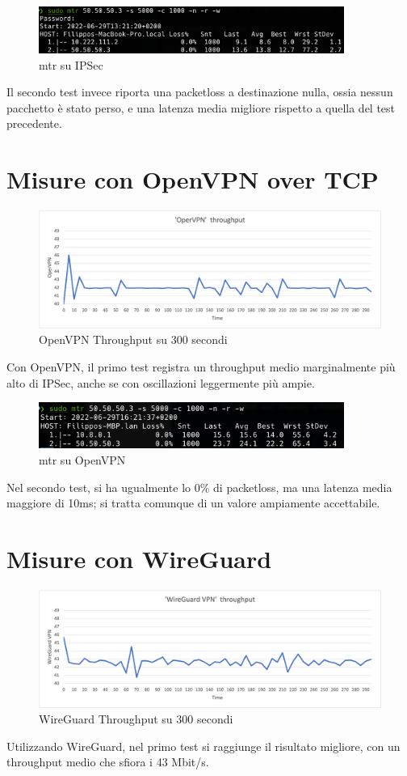 \begin{figure}[ht]
    \centering
    \includegraphics[width=10cm]{figure/mtr_16min_ipsec.png}
    \caption{mtr su IPSec}
\end{figure}
Il secondo test invece riporta una packetloss a destinazione nulla, ossia nessun pacchetto è stato perso, e una latenza media migliore rispetto a quella del test precedente.


\section{Misure con OpenVPN over TCP}
\begin{figure}[ht]
    \centering
    \includegraphics[width=12cm]{figure/vpn_thr.png-3.png}
    \caption{OpenVPN Throughput su 300 secondi}
\end{figure}
Con OpenVPN, il primo test registra un throughput medio marginalmente più alto di IPSec, anche se con oscillazioni leggermente più ampie.

\begin{figure}[ht]
    \centering
    \includegraphics[width=10cm]{figure/mtr_16min_ovpn.png}
    \caption{mtr su OpenVPN}
\end{figure}
Nel secondo test, si ha ugualmente lo 0\% di packetloss, ma una latenza media maggiore di 10ms; si tratta comunque di un valore ampiamente accettabile.


\section{Misure con WireGuard}
\begin{figure}[ht]
    \centering
    \includegraphics[width=12cm]{figure/vpn_thr.png-4.png}
    \caption{WireGuard Throughput su 300 secondi}
\end{figure}
Utilizzando WireGuard, nel primo test si raggiunge il risultato migliore, con un throughput medio che sfiora i 43 Mbit/s.


